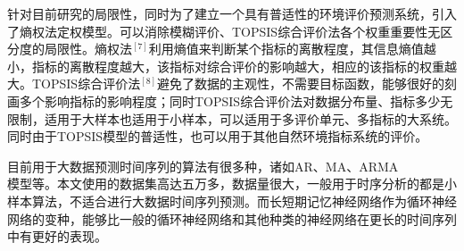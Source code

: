\documentclass[UTF8]{ctexart}
\begin{document}

针对目前研究的局限性，同时为了建立一个具有普适性的环境评价预测系统，引入了熵权法定权模型。可以消除模糊评价、TOPSIS综合评价法各个权重重要性无区分度的局限性。熵权法$^{[7]}$利用熵值来判断某个指标的离散程度，其信息熵值越小，指标的离散程度越大，该指标对综合评价的影响越大，相应的该指标的权重越大。TOPSIS综合评价法$^{[8]}$避免了数据的主观性，不需要目标函数，能够很好的刻画多个影响指标的影响程度；同时TOPSIS综合评价法对数据分布量、指标多少无限制，适用于大样本也适用于小样本，可以适用于多评价单元、多指标的大系统。同时由于TOPSIS模型的普适性，也可以用于其他自然环境指标系统的评价。

目前用于大数据预测时间序列的算法有很多种，诸如AR、MA、ARMA\\模型等。本文使用的数据集高达五万多，数据量很大，一般用于时序分析的都是小样本算法，不适合进行大数据时间序列预测。而长短期记忆神经网络作为循环神经网络的变种，能够比一般的循环神经网络和其他种类的神经网络在更长的时间序列中有更好的表现。
\end{document}
